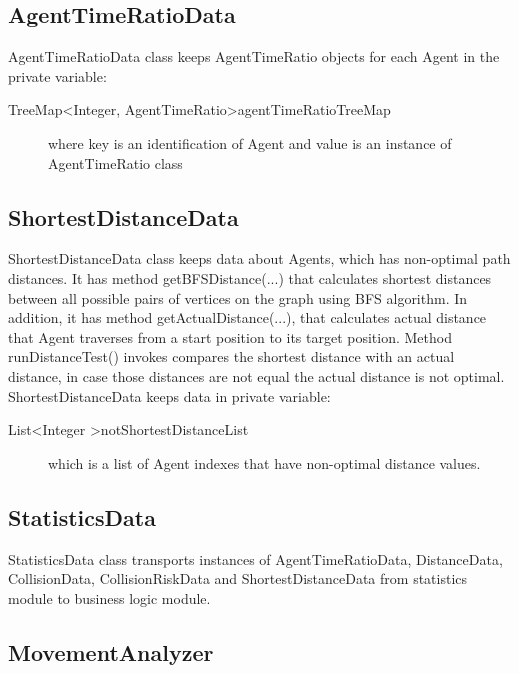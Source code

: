 \documentclass[thesis=B,english]{FITthesis}[2019/12/23]
\begin{document}
\subsection{AgentTimeRatioData}

AgentTimeRatioData class keeps AgentTimeRatio objects for each Agent in the private variable:
\begin{description}
\item[TreeMap\textless Integer, AgentTimeRatio\textgreater agentTimeRatioTreeMap]  where key is an identification of Agent and value is an instance of AgentTimeRatio class
\end{description}


\subsection{ShortestDistanceData}

ShortestDistanceData class keeps data about Agents, which has non-optimal path distances. It has method getBFSDistance(...) that calculates shortest distances between all possible pairs of vertices on the graph using BFS algorithm. In addition, it has method getActualDistance(...), that calculates actual distance that Agent traverses from a start position to its target position. Method runDistanceTest() invokes compares the shortest distance with an actual distance, in case those distances are not equal the actual distance is not optimal. ShortestDistanceData keeps data in private variable:
\begin{description}
\item[List\textless Integer \textgreater notShortestDistanceList] which is a list of Agent indexes that have non-optimal distance values.
\end{description}



\subsection{StatisticsData}

StatisticsData class transports instances of AgentTimeRatioData, DistanceData, CollisionData, CollisionRiskData and ShortestDistanceData from statistics module to business logic module.  

\subsection{MovementAnalyzer}
\end{document}
